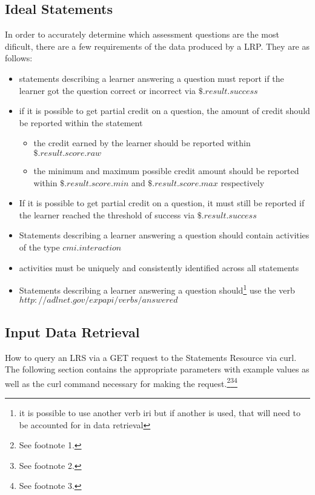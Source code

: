 \documentclass{article}
\begin{document}
\subsection{Ideal Statements}
In order to accurately determine which assessment questions are the
most dificult, there are a few requirements of the data produced by a
LRP. They are as follows:
\begin{itemize}
\item statements describing a learner answering a question must report
  if the learner got the question correct or incorrect via $\$.result.success$
\item if it is possible to get partial credit on a question, the amount
  of credit should be reported within the statement
  \begin{itemize}
  \item the credit earned by the learner should be reported within \\ $\$.result.score.raw$
  \item the minimum and maximum possible credit amount should be
    reported within $\$.result.score.min$ and $\$.result.score.max$
    respectively
  \end{itemize}
\item If it is possible to get partial credit on a question, it must
  still be reported if the learner reached the threshold of success
  via $\$.result.success$
\item Statements describing a learner answering a question should
  contain activities of the type $cmi.interaction$
\item activities must be uniquely and consistently identified across
  all statements
\item Statements describing a learner answering a question
  should\footnote{\label{verbIRI} it is possible to use another verb iri but if another is
    used, that will need to be accounted for in data retrieval} use
  the verb $http://adlnet.gov/expapi/verbs/answered$
\end{itemize}

\subsection{Input Data Retrieval}
How to query an LRS via a GET request to the Statements Resource via
curl. The following section contains the appropriate parameters with
example values as well as the curl command necessary for making the request.\footnote{\label{refMoreLink} See footnote 1.}\footnote{\label{refnoZ} See footnote 2.}\footnote{\label{refallTime} See footnote 3.}
\end{document}
